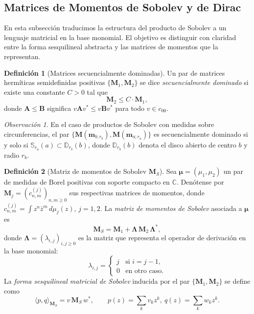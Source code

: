 \documentclass[12pt,a4paper]{article}
\theoremstyle{definition}
\newtheorem{definition}{Definición}
\theoremstyle{remark}
\newtheorem{remark}{Observación}
\begin{document}
\subsection{Matrices de Momentos de Sobolev y de Dirac}\label{sec:momentos_sobolev}

En esta subsección traducimos la estructura del producto de Sobolev a un lenguaje matricial en la base monomial. El objetivo es distinguir con claridad entre la forma sesquilineal abstracta y las matrices de momentos que la representan.

\begin{definition}[Matrices secuencialmente dominadas]\label{def:dominacion_secuencial}
  Un par de matrices hermíticas semidefinidas positivas $\{\mathbf{M}_1, \mathbf{M}_2\}$ se dice \emph{secuencialmente dominado} si existe una constante $C > 0$ tal que
  \[
    \mathbf{M}_2 \leq C \cdot \mathbf{M}_1,
  \]
  donde $\mathbf{A} \leq \mathbf{B}$ significa $v \mathbf{A} v^* \leq v \mathbf{B} v^*$ para todo $v \in c_{00}$.
\end{definition}

\begin{remark}
  En el caso de productos de Sobolev con medidas sobre circunferencias, el par $\{\mathbf{M}(\mathbf{m}_{b;r_b}), \mathbf{M}(\mathbf{m}_{a;r_a})\}$ es secuencialmente dominado si y solo si $\mathbb{S}_{r_a}(a) \subset \mathbb{D}_{r_b}(b)$, donde $\mathbb{D}_{r_b}(b)$ denota el disco abierto de centro $b$ y radio $r_b$.
\end{remark}

\begin{definition}[Matriz de momentos de Sobolev $\mathbf{M}_S$]\label{def:matriz_sobolev}
  Sea $\boldsymbol{\mu} = (\mu_1, \mu_2)$ un par de medidas de Borel positivas con soporte compacto en $\mathbb{C}$. Denótense por $\mathbf{M}_j = (c^{(j)}_{n,m})_{n,m \geq 0}$ sus respectivas matrices de momentos, donde $c^{(j)}_{n,m} = \int z^n \bar{z}^m \, d\mu_j(z)$, $j = 1, 2$. La \emph{matriz de momentos de Sobolev} asociada a $\boldsymbol{\mu}$ es
  \[
    \mathbf{M}_S = \mathbf{M}_1 + \boldsymbol{\Lambda}\, \mathbf{M}_2\, \boldsymbol{\Lambda}^*,
  \]
  donde $\boldsymbol{\Lambda} = (\lambda_{i,j})_{i,j \geq 0}$ es la matriz que representa el operador de derivación en la base monomial:
  \[
    \lambda_{i,j} = \begin{cases} j & \text{si } i = j - 1, \\ 0 & \text{en otro caso.} \end{cases}
  \]
  La \emph{forma sesquilineal matricial de Sobolev} inducida por el par $\{\mathbf{M}_1, \mathbf{M}_2\}$ se define como
  \[
    \langle p, q \rangle_{\mathbf{M}_S} = v\, \mathbf{M}_S\, w^*, \qquad p(z) = \sum_k v_k z^k,\ q(z) = \sum_k w_k z^k.
  \]
\end{definition}
\end{document}
